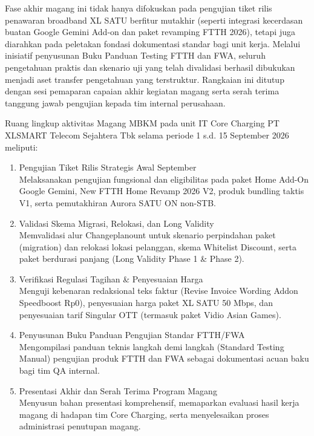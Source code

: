 \documentclass[12pt,a4paper]{article}
\begin{document}
Fase akhir magang ini tidak hanya difokuskan pada pengujian tiket rilis penawaran broadband XL SATU berfitur mutakhir (seperti integrasi kecerdasan buatan Google Gemini Add-on dan paket revamping FTTH 2026), tetapi juga diarahkan pada peletakan fondasi dokumentasi standar bagi unit kerja. Melalui inisiatif penyusunan Buku Panduan Testing FTTH dan FWA, seluruh pengetahuan praktis dan skenario uji yang telah divalidasi berhasil dibukukan menjadi aset transfer pengetahuan yang terstruktur. Rangkaian ini ditutup dengan sesi pemaparan capaian akhir kegiatan magang serta serah terima tanggung jawab pengujian kepada tim internal perusahaan.

\vspace{0.3cm}
Ruang lingkup aktivitas Magang MBKM pada unit IT Core Charging PT XLSMART Telecom Sejahtera Tbk selama periode 1 s.d. 15 September 2026 meliputi:
\begin{enumerate}[label=\arabic*),leftmargin=1.5em,itemsep=1pt,topsep=2pt]
    \item Pengujian Tiket Rilis Strategis Awal September\\
    Melaksanakan pengujian fungsional dan eligibilitas pada paket Home Add-On Google Gemini, New FTTH Home Revamp 2026 V2, produk bundling taktis V1, serta pemutakhiran Aurora SATU ON non-STB.
    \item Validasi Skema Migrasi, Relokasi, dan Long Validity\\
    Memvalidasi alur Changeplanount untuk skenario perpindahan paket (migration) dan relokasi lokasi pelanggan, skema Whitelist Discount, serta paket berdurasi panjang (Long Validity Phase 1 \& Phase 2).
    \item Verifikasi Regulasi Tagihan \& Penyesuaian Harga\\
    Menguji kebenaran redaksional teks faktur (Revise Invoice Wording Addon Speedboost Rp0), penyesuaian harga paket XL SATU 50 Mbps, dan penyesuaian tarif Singular OTT (termasuk paket Vidio Asian Games).
    \item Penyusunan Buku Panduan Pengujian Standar FTTH/FWA\\
    Mengompilasi panduan teknis langkah demi langkah (Standard Testing Manual) pengujian produk FTTH dan FWA sebagai dokumentasi acuan baku bagi tim QA internal.
    \item Presentasi Akhir dan Serah Terima Program Magang\\
    Menyusun bahan presentasi komprehensif, memaparkan evaluasi hasil kerja magang di hadapan tim Core Charging, serta menyelesaikan proses administrasi penutupan magang.
\end{enumerate}
\end{document}
